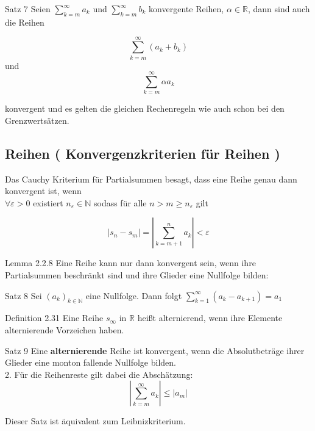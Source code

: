 \documentclass[headsepline,12pt,a4paper]{scrartcl}
\begin{document}
\item[Satz 7] 
Seien $\sum\limits_{k=m}^{\infty} a_k$ und $\sum\limits_{k=m}^{\infty} b_k$ konvergente Reihen, $\alpha \in \mathbb{R}$, dann sind auch die Reihen

$$ \sum\limits_{k=m}^{\infty} (a_k+b_k) $$ und  $$\sum\limits_{k=m}^{\infty} \alpha a_k$$

konvergent und es gelten die gleichen Rechenregeln wie auch schon bei den Grenzwertsätzen. \\

\newpage

\subsection*{Reihen ( Konvergenzkriterien für Reihen ) }

Das Cauchy Kriterium für Partialsummen besagt, dass eine Reihe genau dann konvergent ist, wenn \\

$\forall \varepsilon >0 $ existiert $ n_\varepsilon \in \mathbb{N} $ sodass für alle $n>m\geq  n_\varepsilon$ gilt 

$$ |s_n - s_m| = |\sum\limits_{k=m+1}^{n} a_k| < \varepsilon $$

\item[Lemma 2.2.8]
Eine Reihe kann nur dann konvergent sein, wenn ihre Partialsummen beschränkt sind und ihre Glieder eine Nullfolge bilden: \\

\item[Satz 8] 
Sei $(a_k)_{k \in \mathbb{N}}$ eine Nullfolge. Dann folgt $\sum\limits_{k=1}^{\infty} (a_k - a_{k+1})=a_1$

\item[Definition 2.31]
Eine Reihe $s_{\infty}$ in $\mathbb{R}$ heißt alternierend, wenn ihre Elemente alternierende Vorzeichen haben.

\item[Satz 9]
Eine \textbf{alternierende} Reihe ist konvergent, wenn die Absolutbeträge ihrer Glieder eine monton fallende Nullfolge bilden. \\

2. Für die Reihenreste gilt dabei die Abschätzung: \\
$$ |\sum\limits_{k=m}^{\infty} a_k| \leq |a_m|$$

Dieser Satz ist äquivalent zum Leibnizkriterium. \\
\end{document}
